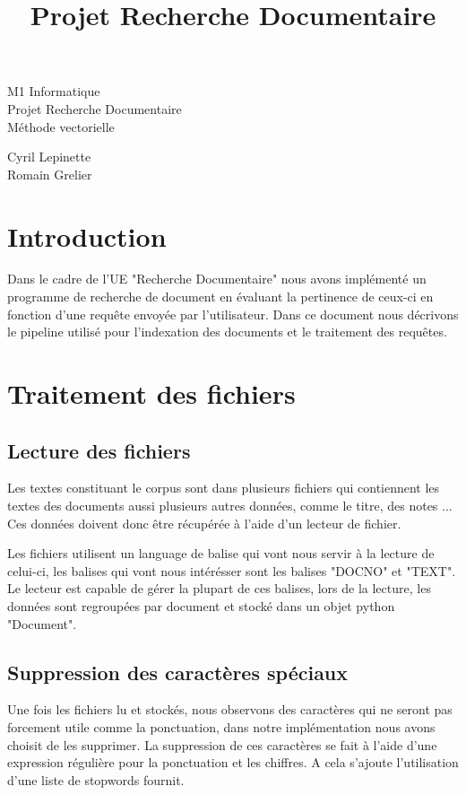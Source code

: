 \documentclass[11pt]{article}
\begin{document}
\title{Projet Recherche Documentaire}



\begin{center}


\Huge M1 Informatique \\
\vspace{3cm}
Projet Recherche Documentaire\\

Méthode vectorielle \LARGE
\end{center}






\vspace{15cm}
Cyril Lepinette \\
Romain Grelier

\pagebreak

\section{Introduction}
Dans le cadre de l'UE "Recherche Documentaire" nous avons implémenté un programme de recherche de document en évaluant la pertinence de ceux-ci en fonction d'une requête envoyée par l'utilisateur.
Dans ce document nous décrivons le pipeline utilisé pour l'indexation des documents et le traitement des requêtes.

\section{Traitement des fichiers}

\subsection{Lecture des fichiers}
Les textes constituant le corpus sont dans plusieurs fichiers qui contiennent les textes des documents aussi plusieurs autres données, comme le titre, des notes ...
Ces données doivent donc être récupérée à l'aide d'un lecteur de fichier.

Les fichiers utilisent un language de balise qui vont nous servir à la lecture de celui-ci, les balises qui vont nous intérésser sont les balises "DOCNO" et "TEXT".
Le lecteur est capable de gérer la plupart de ces balises, lors de la lecture, les données sont regroupées par document et stocké dans un objet python "Document".

\subsection{Suppression des caractères spéciaux}
Une fois les fichiers lu et stockés, nous observons des caractères qui ne seront pas forcement utile comme la ponctuation, dans notre implémentation nous avons choisit de les supprimer.
La suppression de ces caractères se fait à l'aide d'une expression régulière pour la ponctuation et les chiffres. A cela s'ajoute l'utilisation d'une liste de stopwords fournit.
\end{document}
